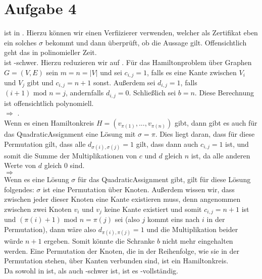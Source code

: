 \documentclass[a4paper,11pt]{scrartcl}
\begin{document}
	\section*{Aufgabe 4}
	 ist in . Hierzu können wir einen Verfiizierer verwenden, welcher als Zertifikat eben ein solches $\sigma$ bekommt und dann überprüft, ob die Aussage gilt. Offensichtlich geht das in polinomieller Zeit.\\
	
	 ist -schwer. Hierzu reduzieren wir  auf . Für das Hamiltonproblem über Graphen $G=(V,E)$ sein $m=n=\vert V \vert$ und sei $c_{i,j} = 1$, falls es eine Kante zwischen $V_i$ und $V_j$ gibt und $c_{i,j} = n+1$ sonst. Außerdem sei $d_{i,j} = 1$, falls $(i+1) \text{ mod } n = j$, andernfalls $d_{i,j}=0$. Schließlich sei $b=n$. Diese Berechnung ist offensichtlich polynomiell.\\
	
	 $\Rightarrow$ .\\
	Wenn es einen Hamiltonkreis $H=(v_{\pi(1)},...,v_{\pi(n)})$ gibt, dann gibt es auch für das QuadraticAssignment eine Lösung mit $\sigma = \pi$. Dies liegt daran, dass für diese Permutation gilt, dass alle $d_{\sigma(i),\sigma(j)} = 1$ gilt, dass dann auch $c_{i,j}=1$ ist, und somit die Summe der Multiplikationen von $c$ und $d$ gleich $n$ ist, da alle anderen Werte von $d$ gleich $0$ sind.\\
	
	 $\Rightarrow$ \\
	Wenn es eine Lösung $\sigma$ für das QuadraticAssignment gibt, gilt für diese Lösung folgendes: $\sigma$ ist eine Permutation über Knoten. Außerdem wissen wir, dass zwischen jeder dieser Knoten eine Kante existieren muss, denn angenommen zwischen zwei Knoten $v_i$ und $v_j$ keine Kante existiert und somit $c_{i,j}=n+1$ ist und $(\pi(i) + 1) \text{ mod } n = \pi(j)$ sei (also $j$ kommt eins nach $i$ in der Permutation), dann wäre also $d_{\pi(i),\pi(j)}=1$ und die Multiplikation beider würde $n+1$ ergeben. Somit könnte die Schranke $b$ nicht mehr eingehalten werden. Eine Permutation der Knoten, die in der Reihenfolge, wie sie in der Permutation stehen, über Kanten verbunden sind, ist ein Hamiltonkreis.\\
	
	Da  sowohl in  ist, als auch -schwer ist, ist es -vollständig.
\end{document}
